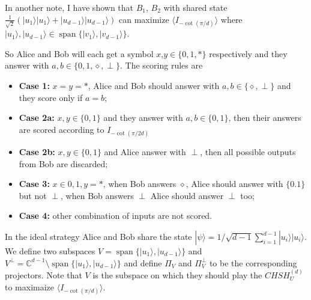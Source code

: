\documentclass[11pt,letterpaper]{article}
\newcommand{\ket}[1]{|#1\rangle}
\DeclareMathOperator{\spn}{span}
\newcommand{\C}{\mathbb{C}}
\newcommand{\1}{\mathbb{1}}
\newcommand{\CHSH}{CHSH^{(d)}}
\theoremstyle{definition}
\begin{document}
In another note, I have shown that $B_1$, $B_2$ with shared state $\frac{1}{\sqrt{2}} (\ket{u_1}\ket{u_1} + \ket{u_{d-1}}\ket{u_{d-1}})$ 
can maximize $\langle I_{-\cot(\pi/d)}\rangle$ where $\ket{u_1}, \ket{u_{d-1}} \in \spn\{\ket{v_1}, \ket{v_{d-1}}\}$.

So Alice and Bob will each get a symbol $x$,$y \in \{ 0, 1, \ast\}$ respectively and they answer with $a,b \in \{0,1,\diamond,\perp\}$. 
The scoring rules are
\begin{itemize}
	\item \textbf{Case 1:} $x = y = \ast$, Alice and Bob should answer with $a, b \in \{\diamond, \perp\}$ and 
	they score only if $a = b$;
	\item \textbf{Case 2a:} $x,y \in \{0,1\}$ and they answer with $a,b \in \{0,1\}$, then
	their answers are scored according to $I_{-\cot(\pi/2d)}$
	\item \textbf{Case 2b:} $x,y \in \{0,1\}$ and Alice answer with $\perp$, then all possible outputs from Bob
	are discarded;
	\item \textbf{Case 3:} $x \in {0,1}, y = \ast$, when Bob answers $\diamond$, Alice should answer with $\{0.1\}$ but not $\perp$,
	when Bob answers $\perp$ Alice should answer $\perp$ too;
	\item \textbf{Case 4:} other combination of inputs are not scored.
\end{itemize}
In the ideal strategy Alice and Bob share the state $\ket{\psi} =1/\sqrt{d-1} \sum_{i=1}^{d-1} \ket{u_i}\ket{u_i}$.
We define two subspaces $V = \spn\{\ket{u_1}, \ket{u_{d-1}}\}$ and $V^\perp = \C^{d-1} \setminus\spn\{\ket{u_1}, \ket{u_{d-1}}\}$ and
define $\Pi_V$ and $\Pi_{V}^\perp$ to be the corresponding projectors. Note that $V$ is the subspace on which they should play the 
$\CHSH_U$ to maximaize $\langle I_{-\cot(\pi/d)} \rangle$.
\end{document}
